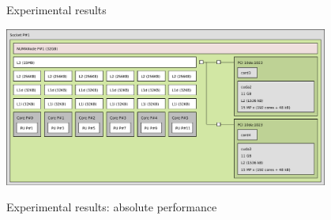 \begin{frame}{Experimental results}
  \begin{center}
    \includegraphics[width=0.8\textwidth]{figures/sirocco2}
  \end{center}

\end{frame}

\begin{frame}{Experimental results: absolute performance}
  \centering

\end{frame}

